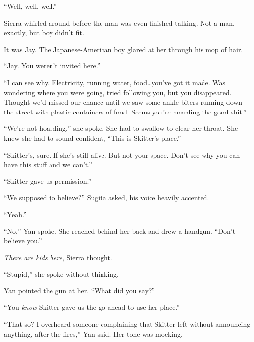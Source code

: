 ``Well, well, well.''



Sierra whirled around before the man was even finished talking.  Not a man, exactly, but boy didn't fit.



It was Jay.  The Japanese-American boy glared at her through his mop of hair.



``Jay.  You weren't invited here.''



``I can see why.  Electricity, running water, food\ldots you've got it made.  Was wondering where you were going, tried following you, but you disappeared.  Thought we'd missed our chance until we saw some ankle-biters running down the street with plastic containers of food.  Seems you're hoarding the good shit.''



``We're not hoarding,'' she spoke.  She had to swallow to clear her throat.  She knew she had to sound confident, ``This is Skitter's place.''



``Skitter's, sure.  If she's still alive.  But not your space.  Don't see why you can have this stuff and we can't.''



``Skitter gave us permission.''



``We supposed to believe?'' Sugita asked, his voice heavily accented.



``Yeah.''



``No,'' Yan spoke.  She reached behind her back and drew a handgun.  ``Don't believe you.''



\emph{There are kids here}, Sierra thought.



``Stupid,'' she spoke without thinking.



Yan pointed the gun at her.  ``What did you say?''



``You \emph{know} Skitter gave us the go-ahead to use her place.''



``That so?  I overheard someone complaining that Skitter left without announcing anything, after the fires,'' Yan said.  Her tone was mocking.



